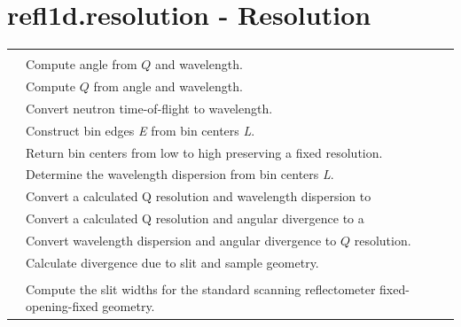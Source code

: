 \documentclass[letterpaper,10pt,english]{sphinxmanual}
\begin{document}
\section{refl1d.resolution - Resolution}
\label{api/resolution:refl1d-resolution-resolution}\label{api/resolution::doc}
\begin{tabulary}{\linewidth}{LL}
\hline

{\hyperref[api/resolution:refl1d.resolution.FWHM2sigma]{}}
 & 

\\

{\hyperref[api/resolution:refl1d.resolution.QL2T]{}}
 & 
Compute angle from $Q$ and wavelength.
\\

{\hyperref[api/resolution:refl1d.resolution.TL2Q]{}}
 & 
Compute $Q$ from angle and wavelength.
\\

{\hyperref[api/resolution:refl1d.resolution.TOF2L]{}}
 & 
Convert neutron time-of-flight to wavelength.
\\

{\hyperref[api/resolution:refl1d.resolution.binedges]{}}
 & 
Construct bin edges \emph{E} from bin centers \emph{L}.
\\

{\hyperref[api/resolution:refl1d.resolution.bins]{}}
 & 
Return bin centers from low to high preserving a fixed resolution.
\\

{\hyperref[api/resolution:refl1d.resolution.binwidths]{}}
 & 
Determine the wavelength dispersion from bin centers \emph{L}.
\\

{\hyperref[api/resolution:refl1d.resolution.dQdL2dT]{}}
 & 
Convert a calculated Q resolution and wavelength dispersion to
\\

{\hyperref[api/resolution:refl1d.resolution.dQdT2dLoL]{}}
 & 
Convert a calculated Q resolution and angular divergence to a
\\

{\hyperref[api/resolution:refl1d.resolution.dTdL2dQ]{}}
 & 
Convert wavelength dispersion and angular divergence to $Q$ resolution.
\\

{\hyperref[api/resolution:refl1d.resolution.divergence]{}}
 & 
Calculate divergence due to slit and sample geometry.
\\

{\hyperref[api/resolution:refl1d.resolution.sigma2FWHM]{}}
 & 

\\

{\hyperref[api/resolution:refl1d.resolution.slit_widths]{}}
 & 
Compute the slit widths for the standard scanning reflectometer fixed-opening-fixed geometry.
\\
\hline
\end{tabulary}
\end{document}
